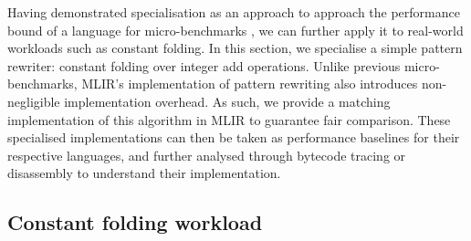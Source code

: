Having demonstrated specialisation as an approach to approach the performance bound of a language for micro-benchmarks%
, we can further apply it to real-world workloads such as constant folding.
In this section, we specialise a simple pattern rewriter: constant folding over integer add operations. Unlike previous micro-benchmarks, MLIR's implementation of pattern rewriting also introduces non-negligible implementation overhead. As such, we provide a matching implementation of this algorithm in MLIR to guarantee fair comparison.
These specialised implementations can then be taken as performance baselines for their respective languages, and further analysed through bytecode tracing or disassembly to understand their implementation.


\subsection{Constant folding workload}
\label{sec:specialising-pattern-rewriting-workload}


